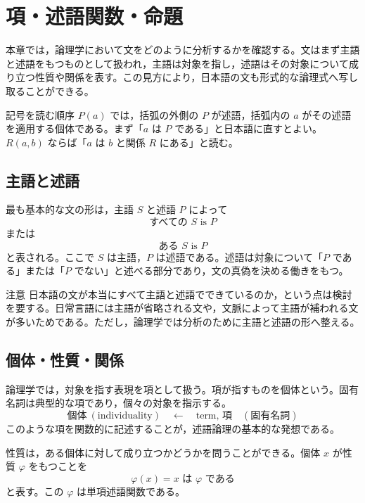 \documentclass[../main.tex]{subfiles}
\begin{document}
\section{項・述語関数・命題}

本章では，論理学において文をどのように分析するかを確認する。文はまず主語と述語をもつものとして扱われ，主語は対象を指し，述語はその対象について成り立つ性質や関係を表す。この見方により，日本語の文も形式的な論理式へ写し取ることができる。

\begin{sidebox}[TBred]{記号を読む順序}
  \(P(a)\) では，括弧の外側の \(P\) が述語，括弧内の \(a\) がその述語を適用する個体である。まず「\(a\) は \(P\) である」と日本語に直すとよい。\(R(a,b)\) ならば「\(a\) は \(b\) と関係 \(R\) にある」と読む。
\end{sidebox}

\subsection{主語と述語}

最も基本的な文の形は，主語 \(S\) と述語 \(P\) によって
\[
  \text{すべての } S \text{ is } P
\]
または
\[
  \text{ある } S \text{ is } P
\]
と表される。ここで \(S\) は主語，\(P\) は述語である。述語は対象について「\(P\) である」または「\(P\) でない」と述べる部分であり，文の真偽を決める働きをもつ。

\begin{sidebox}[TBred]{注意}
  日本語の文が本当にすべて主語と述語でできているのか，という点は検討を要する。日常言語には主語が省略される文や，文脈によって主語が補われる文が多いためである。ただし，論理学では分析のために主語と述語の形へ整える。
\end{sidebox}

\subsection{個体・性質・関係}

論理学では，対象を指す表現を項として扱う。項が指すものを個体という。固有名詞は典型的な項であり，個々の対象を指示する。
\[
  \text{個体} \ (\mathrm{individuality})
  \quad \longleftarrow \quad
  \text{term, 項}
  \quad
  (\text{固有名詞})
\]
このような項を関数的に記述することが，述語論理の基本的な発想である。

性質は，ある個体に対して成り立つかどうかを問うことができる。個体 \(x\) が性質 \(\varphi\) をもつことを
\[
  \varphi(x)
  =
  x \text{ は } \varphi \text{ である}
\]
と表す。この \(\varphi\) は単項述語関数である。
\end{document}
